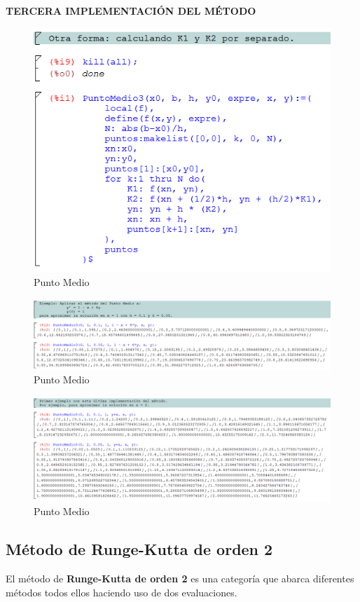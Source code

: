\documentclass[paper=a4, fontsize=11pt]{scrartcl} %
\numberwithin{equation}{section}
\begin{document}
	\textbf{TERCERA IMPLEMENTACIÓN DEL MÉTODO}
	\begin{figure}[H]
		\includegraphics[width=1\textwidth]{Pm7.png}
		\caption{Punto Medio}
		\label{fig:Pm7}
	\end{figure}
	\begin{figure}[H]
		\includegraphics[width=1\textwidth]{Pm8.png}
		\caption{Punto Medio}
		\label{fig:Pm8}
	\end{figure}
	\begin{figure}[H]
		\includegraphics[width=1\textwidth]{Pm9.png}
		\caption{Punto Medio}
		\label{fig:Pm9}
	\end{figure}
	
	\subsection{Método de Runge-Kutta de orden 2}
	El método de \textbf{Runge-Kutta de orden 2} es una categoría que abarca diferentes métodos todos ellos haciendo uso de dos evaluaciones.
\end{document}
